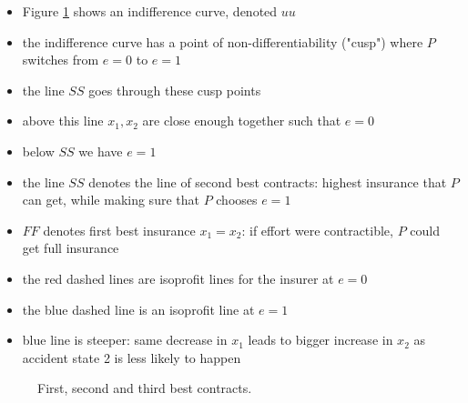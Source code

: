 \documentclass[11pt,english]{beamer}
\begin{document}
\begin{frame}[allowframebreaks]
\begin{itemize}
\item Figure \ref{fig:insurancecontracts} shows an indifference curve, denoted $uu$\\
\label{sec-7-2-5}%
\item the indifference curve has a point of non-differentiability ("cusp") where $P$ switches from $e=0$ to $e=1$\\
\label{sec-7-2-6}%
\item the line $SS$ goes through these cusp points\\
\label{sec-7-2-7}%
\item above this line $x_{1},x_{2}$ are close enough together such that $e=0$\\
\label{sec-7-2-8}%
\item below $SS$ we have $e=1$\\
\label{sec-7-2-9}%
\item the line $SS$ denotes the line of second best contracts: highest insurance that $P$ can get, while making sure that $P$ chooses $e=1$\\
\label{sec-7-2-10}%
\item $FF$ denotes first best insurance $x_{1}=x_{2}$: if effort were contractible, $P$ could get full insurance\\
\label{sec-7-2-11}%
\item the red dashed lines are isoprofit lines for the insurer at $e=0$\\
\label{sec-7-2-12}%
\item the blue dashed line is an isoprofit line at $e=1$\\
\label{sec-7-2-13}%
\item blue line is steeper: same decrease in $x_{1}$ leads to bigger increase in $x_{2}$ as accident state 2 is less likely to happen\\
\label{sec-7-2-14}%
\end{itemize} %
\end{frame}

\begin{frame}[allowframebreaks]
\begin{figure}[tbp]
\centering
{} \vspace*{0mm}
\caption{First, second and third best contracts.}
\label{fig:insurancecontracts}
\end{figure}
\end{frame}
\end{document}
